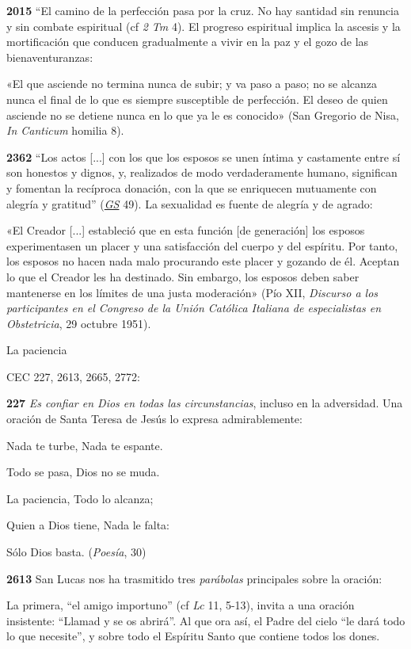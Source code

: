 \documentclass[]{article}
\begin{document}
\textbf{2015} ``El camino de la perfección pasa por la cruz. No hay
santidad sin renuncia y sin combate espiritual (cf \emph{2 Tm} 4). El
progreso espiritual implica la ascesis y la mortificación que conducen
gradualmente a vivir en la paz y el gozo de las bienaventuranzas:

«El que asciende no termina nunca de subir; y va paso a paso; no se
alcanza nunca el final de lo que es siempre susceptible de perfección.
El deseo de quien asciende no se detiene nunca en lo que ya le es
conocido» (San Gregorio de Nisa, \emph{In Canticum} homilia 8).

\textbf{2362} ``Los actos {[}...{]} con los que los esposos se unen
íntima y castamente entre sí son honestos y dignos, y, realizados de
modo verdaderamente humano, significan y fomentan la recíproca donación,
con la que se enriquecen mutuamente con alegría y gratitud''
(\href{http://www.vatican.va/archive/hist_councils/ii_vatican_council/documents/vat-ii_const_19651207_gaudium-et-spes_sp.html}{\emph{GS}}
49). La sexualidad es fuente de alegría y de agrado:

«El Creador {[}...{]} estableció que en esta función {[}de generación{]}
los esposos experimentasen un placer y una satisfacción del cuerpo y del
espíritu. Por tanto, los esposos no hacen nada malo procurando este
placer y gozando de él. Aceptan lo que el Creador les ha destinado. Sin
embargo, los esposos deben saber mantenerse en los límites de una justa
moderación» (Pío XII, \emph{Discurso a los participantes en el Congreso
de la Unión Católica Italiana de especialistas en Obstetricia}, 29
octubre 1951).

La paciencia

CEC 227, 2613, 2665, 2772:

\textbf{227} \emph{Es confiar en Dios en todas las circunstancias},
incluso en la adversidad. Una oración de Santa Teresa de Jesús lo
expresa admirablemente:

Nada te turbe, Nada te espante.

Todo se pasa, Dios no se muda.

La paciencia, Todo lo alcanza; 

Quien a Dios tiene, Nada le falta: 

Sólo Dios basta. (\emph{Poesía}, 30)

\textbf{2613} San Lucas nos ha trasmitido tres \emph{parábolas}
principales sobre la oración:

La primera, ``el amigo importuno'' (cf \emph{Lc} 11, 5-13), invita a una
oración insistente: ``Llamad y se os abrirá''. Al que ora así, el Padre
del cielo ``le dará todo lo que necesite'', y sobre todo el Espíritu
Santo que contiene todos los dones.
\end{document}
